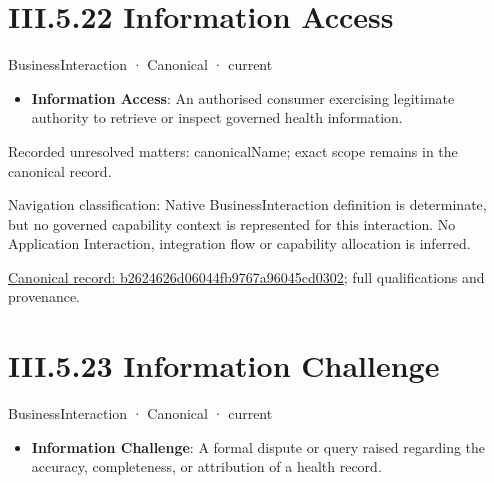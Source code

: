 \section*{III.5.22 Information Access}
\label{navigation:III.5.22}

\label{element:b2624626d06044fb9767a96045cd0302}
{\small BusinessInteraction · Canonical · current}\par

\begin{itemize}


\item \textbf{Information Access}: An authorised consumer exercising legitimate authority to retrieve or inspect governed health information.

\end{itemize}

{\small Recorded unresolved matters: canonicalName; exact scope remains in the canonical record.}\par
{\small Navigation classification: Native BusinessInteraction definition is determinate, but no governed capability context is represented for this interaction. No Application Interaction, integration flow or capability allocation is inferred.}\par
{\footnotesize \href{../../../../../../../../continuum/business/business-interaction/b2624626d06044fb9767a96045cd0302.md}{Canonical record: b2624626d06044fb9767a96045cd0302}; full qualifications and provenance.}\par
\section*{III.5.23 Information Challenge}
\label{navigation:III.5.23}

\label{element:44d71c390a8f435cbb596601e627bdfa}
{\small BusinessInteraction · Canonical · current}\par

\begin{itemize}


\item \textbf{Information Challenge}: A formal dispute or query raised regarding the accuracy, completeness, or attribution of a health record.

\end{itemize}

